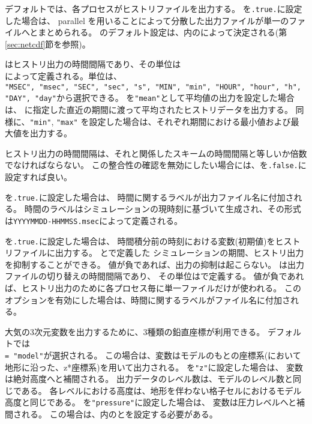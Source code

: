 デフォルトでは、各プロセスがヒストリファイルを出力する。
を\verb|.true.|に設定した場合は、
 parallel \Netcdf を用いることによって分散した出力ファイルが単一のファイルへとまとめられる。
のデフォルト設定は、内のによって決定される(第\ref{sec:netcdf}節を参照)。

はヒストリ出力の時間間隔であり、その単位は\\
によって定義される。単位は、\\
\verb|"MSEC", "msec", "SEC", "sec", "s", "MIN", "min", "HOUR", "hour", "h", "DAY", "day"|から選択できる。
%
を\verb|"mean"|として平均値の出力を設定した場合は、
に指定した直近の期間に渡って平均されたヒストリデータを出力する。
同様に、\verb|"min"|, \verb|"max"| を設定した場合は、それぞれ期間における最小値および最大値を出力する。

ヒストリ出力の時間間隔は、それと関係したスキームの時間間隔と等しいか倍数でなければならない。
この整合性の確認を無効にしたい場合には、を\verb|.false.|に設定すれば良い。

を\verb|.true.|に設定した場合は、
時間に関するラベルが出力ファイル名に付加される。
時間のラベルはシミュレーションの現時刻に基づいて生成され、その形式は\verb|YYYYMMDD-HHMMSS.msec|によって定義される。

を\verb|.true.|に設定した場合は、
時間積分前の時刻における変数(初期値)をヒストリファイルに出力する。
とで定義した
シミュレーションの期間、ヒストリ出力を抑制することができる。
値が負であれば、出力の抑制は起こらない。
は出力ファイルの切り替えの時間間隔であり、
その単位はで定義する。
値が負であれば、ヒストリ出力のために各プロセス毎に単一ファイルだけが使われる。
このオプションを有効にした場合は、時間に関するラベルがファイル名に付加される。

大気の3次元変数を出力するために、3種類の鉛直座標が利用できる。
デフォルトでは\\
 \verb|= "model"|が選択される。
この場合は、変数はモデルのもとの座標系({\scalerm}において地形に沿った、z*座標系)を用いて出力される。
を\verb|"z"|に設定した場合は、 変数は絶対高度へと補間される。
出力データのレベル数は、モデルのレベル数と同じである。
各レベルにおける高度は、地形を伴わない格子セルにおけるモデル高度と同じである。
を\verb|"pressure"|に設定した場合は、
変数は圧力レベルへと補間される。
この場合は、内のとを設定する必要がある。


